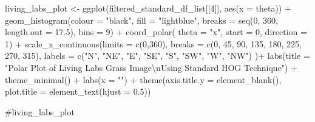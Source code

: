 \documentclass[
  letterpaper,
]{report}
\newenvironment{Shaded}{\begin{snugshade}}{\end{snugshade}}
\newcommand{\AttributeTok}[1]{\textcolor[rgb]{0.40,0.45,0.13}{#1}}
\newcommand{\CommentTok}[1]{\textcolor[rgb]{0.37,0.37,0.37}{#1}}
\newcommand{\DecValTok}[1]{\textcolor[rgb]{0.68,0.00,0.00}{#1}}
\newcommand{\FloatTok}[1]{\textcolor[rgb]{0.68,0.00,0.00}{#1}}
\newcommand{\FunctionTok}[1]{\textcolor[rgb]{0.28,0.35,0.67}{#1}}
\newcommand{\NormalTok}[1]{\textcolor[rgb]{0.00,0.23,0.31}{#1}}
\newcommand{\OtherTok}[1]{\textcolor[rgb]{0.00,0.23,0.31}{#1}}
\newcommand{\SpecialCharTok}[1]{\textcolor[rgb]{0.37,0.37,0.37}{#1}}
\newcommand{\StringTok}[1]{\textcolor[rgb]{0.13,0.47,0.30}{#1}}
\begin{document}
\begin{Shaded}
\begin{Highlighting}[]
\NormalTok{living\_labs\_plot }\OtherTok{\textless{}{-}}
  \FunctionTok{ggplot}\NormalTok{(filtered\_standard\_df\_list[[}\DecValTok{4}\NormalTok{]], }
         \FunctionTok{aes}\NormalTok{(}\AttributeTok{x =}\NormalTok{ theta)) }\SpecialCharTok{+}
  \FunctionTok{geom\_histogram}\NormalTok{(}\AttributeTok{colour =} \StringTok{"black"}\NormalTok{, }
                 \AttributeTok{fill =} \StringTok{"lightblue"}\NormalTok{, }
                 \AttributeTok{breaks =} \FunctionTok{seq}\NormalTok{(}\DecValTok{0}\NormalTok{, }\DecValTok{360}\NormalTok{, }\AttributeTok{length.out =} \FloatTok{17.5}\NormalTok{),}
                 \AttributeTok{bins =} \DecValTok{9}\NormalTok{) }\SpecialCharTok{+}
  \FunctionTok{coord\_polar}\NormalTok{(}
    \AttributeTok{theta =} \StringTok{"x"}\NormalTok{, }
    \AttributeTok{start =} \DecValTok{0}\NormalTok{, }
    \AttributeTok{direction =} \DecValTok{1}\NormalTok{) }\SpecialCharTok{+}
  \FunctionTok{scale\_x\_continuous}\NormalTok{(}\AttributeTok{limits =} \FunctionTok{c}\NormalTok{(}\DecValTok{0}\NormalTok{,}\DecValTok{360}\NormalTok{),}
    \AttributeTok{breaks =} \FunctionTok{c}\NormalTok{(}\DecValTok{0}\NormalTok{, }\DecValTok{45}\NormalTok{, }\DecValTok{90}\NormalTok{, }\DecValTok{135}\NormalTok{, }\DecValTok{180}\NormalTok{, }\DecValTok{225}\NormalTok{, }\DecValTok{270}\NormalTok{, }\DecValTok{315}\NormalTok{), }
    \AttributeTok{labels =} \FunctionTok{c}\NormalTok{(}\StringTok{"N"}\NormalTok{, }\StringTok{"NE"}\NormalTok{, }\StringTok{"E"}\NormalTok{, }\StringTok{"SE"}\NormalTok{, }\StringTok{"S"}\NormalTok{, }\StringTok{"SW"}\NormalTok{, }\StringTok{"W"}\NormalTok{, }\StringTok{"NW"}\NormalTok{)}
\NormalTok{  )}\SpecialCharTok{+}
  \FunctionTok{labs}\NormalTok{(}\AttributeTok{title =} \StringTok{"Polar Plot of Living Labs Grass Image}\SpecialCharTok{\textbackslash{}n}\StringTok{Using Standard HOG Technique"}\NormalTok{) }\SpecialCharTok{+}
  \FunctionTok{theme\_minimal}\NormalTok{() }\SpecialCharTok{+}
  \FunctionTok{labs}\NormalTok{(}\AttributeTok{x =} \StringTok{""}\NormalTok{) }\SpecialCharTok{+}
  \FunctionTok{theme}\NormalTok{(}\AttributeTok{axis.title.y =} \FunctionTok{element\_blank}\NormalTok{(),}
        \AttributeTok{plot.title =} \FunctionTok{element\_text}\NormalTok{(}\AttributeTok{hjust =} \FloatTok{0.5}\NormalTok{))}

\CommentTok{\#living\_labs\_plot}
\end{Highlighting}
\end{Shaded}
\end{document}
